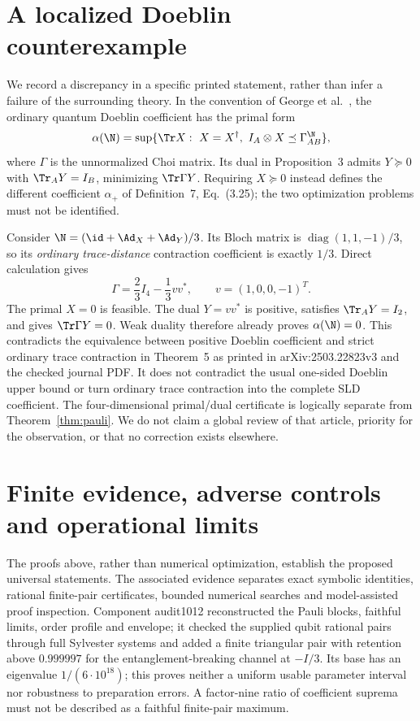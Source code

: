 \section{A localized Doeblin counterexample}\label{sec:doeblin}
We record a discrepancy in a specific printed statement, rather than infer a failure of the surrounding theory. In the convention of George et al.~\cite[Definition~4, Eq.~(3.1)]{Doeblin}, the ordinary quantum Doeblin coefficient has the primal form
\[
 \alpha(\N)=\sup\{\Tr X:\ X=X^\dagger,\ I_A\otimes X\preceq\Gamma_{AB}^{\N}\},
\]
where \(\Gamma\) is the unnormalized Choi matrix. Its dual in Proposition~3 admits \(Y\succeq0\) with \(\Tr_A Y=I_B\), minimizing \(\Tr\Gamma Y\). Requiring \(X\succeq0\) instead defines the different coefficient \(\alpha_+\) of Definition~7, Eq.~(3.25); the two optimization problems must not be identified.

Consider \(\N=(\id+\Ad_X+\Ad_Y)/3\). Its Bloch matrix is \(\operatorname{diag}(1,1,-1)/3\), so its \emph{ordinary trace-distance} contraction coefficient is exactly \(1/3\). Direct calculation gives
\[
 \Gamma=\frac23I_4-\frac13vv^*,\qquad v=(1,0,0,-1)^T.
\]
The primal \(X=0\) is feasible. The dual \(Y=vv^*\) is positive, satisfies \(\Tr_A Y=I_2\), and gives \(\Tr\Gamma Y=0\). Weak duality therefore already proves \(\alpha(\N)=0\).
This contradicts the equivalence between positive Doeblin coefficient and strict ordinary trace contraction in Theorem~5 as printed in arXiv:2503.22823v3 and the checked journal PDF. It does not contradict the usual one-sided Doeblin upper bound or turn ordinary trace contraction into the complete SLD coefficient. The four-dimensional primal/dual certificate is logically separate from Theorem~\ref{thm:pauli}. We do not claim a global review of that article, priority for the observation, or that no correction exists elsewhere.

\section{Finite evidence, adverse controls and operational limits}\label{sec:limits}
The proofs above, rather than numerical optimization, establish the proposed universal statements. The associated evidence separates exact symbolic identities, rational finite-pair certificates, bounded numerical searches and model-assisted proof inspection.
Component audit1012 reconstructed the Pauli blocks, faithful limits, order profile and envelope; it checked the supplied qubit rational pairs through full Sylvester systems and added a finite triangular pair with retention above \(0.999997\) for the entanglement-breaking channel at \(-I/3\). Its base has an eigenvalue \(1/(6\cdot10^{18})\); this proves neither a uniform usable parameter interval nor robustness to preparation errors. A factor-nine ratio of coefficient suprema must not be described as a faithful finite-pair maximum.

